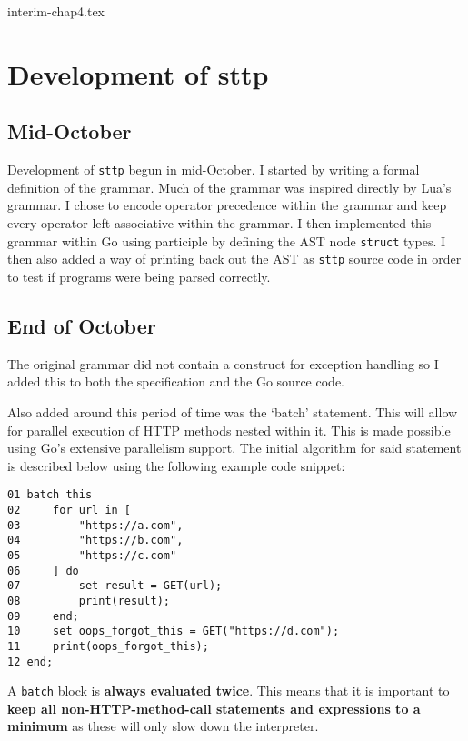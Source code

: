\documentclass[]{interim}
\theoremstyle{definition}
\begin{document}
{interim-chap4.tex}

\chapter{Development of sttp}

\section{Mid-October}

Development of \verb|sttp| begun in mid-October. I started by writing a formal definition of the grammar. Much of the grammar was inspired directly by Lua's grammar\textsuperscript{\cite{ierusalimschy_henrique-de-figueiredo_celes_2020}}. I chose to encode operator precedence within the grammar and keep every operator left associative within the grammar. I then implemented this grammar within Go using participle by defining the AST node \verb|struct| types. I then also added a way of printing back out the AST as \verb|sttp| source code in order to test if programs were being parsed correctly.

\section{End of October}

The original grammar did not contain a construct for exception handling so I added this to both the specification and the Go source code.

Also added around this period of time was the `batch' statement. This will allow for parallel execution of HTTP methods nested within it. This is made possible using Go's extensive parallelism support. The initial algorithm for said statement is described below using the following example code snippet:

\begin{center}
    \begin{verbatim}
01 batch this
02     for url in [
03         "https://a.com",
04         "https://b.com",
05         "https://c.com"
06     ] do
07         set result = GET(url);
08         print(result);
09     end;
10     set oops_forgot_this = GET("https://d.com");
11     print(oops_forgot_this);
12 end;
    \end{verbatim}
\end{center}

A \verb|batch| block is \textbf{always evaluated twice}. This means that it is important to \textbf{keep all non-HTTP-method-call statements and expressions to a minimum} as these will only slow down the interpreter.
\end{document}
